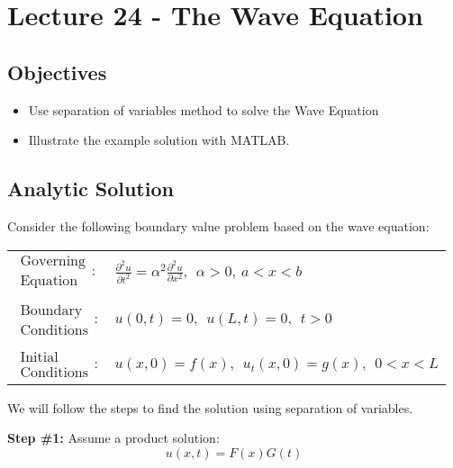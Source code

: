 \chapter{Lecture 24 - The Wave Equation}
\label{ch:lec24}
\section{Objectives}
\begin{itemize}
\item Use separation of variables method to solve the Wave Equation
\item Illustrate the example solution with MATLAB.
\end{itemize}
\setcounter{lstannotation}{0} %

\section{Analytic Solution}
Consider the following boundary value problem based on the wave equation:
\begin{table}
\begin{tabular}{l l}
$\substack{\text{Governing} \\\text{Equation}}: $& $\frac{\partial^2 u}{\partial t^2} = \alpha^2 \frac{\partial^2 u}{\partial x^2}, \ \ \alpha > 0, \ a<x<b$  \\
& \\
$\substack{\text{Boundary} \\ \text{Conditions}}: $& $u(0,t)=0, \ \ u(L,t) = 0, \ \ t>0$\\
& \\
$\substack{\text{Initial} \\ \text{Conditions}}: $ & $u(x,0) = f(x), \ \ u_{t}(x,0) = g(x), \ \ 0<x<L $ \\
\end{tabular}
\end{table}

\vspace{0.25cm}

\noindent We will follow the steps to find the solution using separation of variables.

\vspace{0.5cm}

\noindent\textbf{Step \#1:} Assume a product solution:
\begin{equation*}
u(x,t) = F(x)G(t)
\end{equation*}

